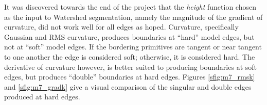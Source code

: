 It was discovered towards the end of the project that the \textit{height} function chosen as the input to Watershed segmentation, namely the magnitude of the gradient of curvature, did not work well for all edges as hoped.
Curvature, specifically Gaussian and RMS curvature, produces boundaries at ``hard'' model edges, but not at ``soft'' model edges.
If the bordering primitives are tangent or near tangent to one another the edge is considered soft; otherwise, it is considered hard.
The derivative of curvature however, is better suited to producing boundaries at soft edges, but produces ``double'' boundaries at hard edges.
Figures \ref{sfig:m7_rmsk} and \ref{sfig:m7_gradk} give a visual comparison of the singular and double edges produced at hard edges.
